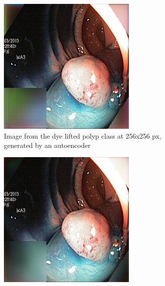     \begin{figure}[t]
        \centering
        \begin{subfigure}[b]{0.4\textwidth}
            \centering
            \includegraphics[width=\textwidth]{experiments/figures/both/DLAE.jpg}
            \caption[Is this in use]%
            {{\small Image from the dye lifted polyp class at 256x256 px, generated by an autoencoder }}    
            \label{fig:polypAEGREEN}
        \end{subfigure}
        \qquad
        \begin{subfigure}[b]{0.4\textwidth}  
            \centering 
            \includegraphics[width=\textwidth]{experiments/figures/both/DLGAN.jpg}

\end{subfigure}
\end{figure}
